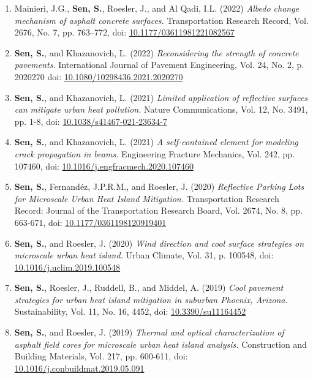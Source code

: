 \documentclass[12pt]{article}
\begin{document}
\begin{enumerate}
	\item Mainieri, J.G., \textbf{Sen, S.}, Roesler, J., and Al Qadi, I.L. (2022) \textit{Albedo change mechanism of asphalt concrete surfaces.} Transportation Research Record, Vol. 2676, No. 7, pp. 763–772, doi: \href{https://doi.org/10.1177/036119812210825670}{10.1177/03611981221082567}
	\item \textbf{Sen, S.}, and Khazanovich, L. (2022) \textit{Reconsidering the strength of concrete pavements.} International Journal of Pavement Engineering, Vol. 24, No. 2, p. 2020270 doi: \href{https://doi.org/10.1080/10298436.2021.2020270}{10.1080/10298436.2021.2020270}
	\item \textbf{Sen, S.}, and Khazanovich, L. (2021) \textit{Limited application of reflective surfaces can mitigate urban heat pollution.} Nature Communications, Vol. 12, No. 3491, pp. 1-8, doi: \href{https://doi.org/10.1038/s41467-021-23634-7}{10.1038/s41467-021-23634-7}
	\item \textbf{Sen, S.}, and Khazanovich, L. (2021) \textit{A self-contained element for modeling crack propagation in beams.} Engineering Fracture Mechanics, Vol. 242, pp. 107460, doi: \href{https://doi.org/10.1016/j.engfracmech.2020.107460}{10.1016/j.engfracmech.2020.107460}			
	\item \textbf{Sen, S.}, Fernand\'ez, J.P.R.M., and Roesler, J. (2020) \textit{Reflective Parking Lots for Microscale Urban Heat Island Mitigation.}  Transportation Research Record: Journal of the Transportation Research Board, Vol. 2674, No. 8, pp. 663-671, doi: \href{https://doi.org/10.1177/0361198120919401}{10.1177/0361198120919401}	
		\item \textbf{Sen, S.}, and Roesler, J. (2020) \textit{Wind direction and cool surface strategies on microscale urban heat island.}  Urban Climate, Vol. 31, p. 100548, doi: \href{https://doi.org/10.1016/j.uclim.2019.100548}{10.1016/j.uclim.2019.100548}
	\item \textbf{Sen, S.}, Roesler, J., Ruddell, B., and Middel, A. (2019) \textit{Cool pavement strategies for urban heat island mitigation in suburban Phoenix, Arizona.}  Sustainability, Vol. 11, No. 16, 4452, doi: \href{https://doi.org/10.3390/su11164452}{10.3390/su11164452}
		\item \textbf{Sen, S.}, and Roesler, J. (2019) \textit{Thermal and optical characterization of asphalt field cores for microscale urban heat island analysis.}  Construction and Building Materials, Vol. 217, pp. 600-611, doi: \href{https://doi.org/10.1016/j.conbuildmat.2019.05.091}{10.1016/j.conbuildmat.2019.05.091}

\end{enumerate}
\end{document}
